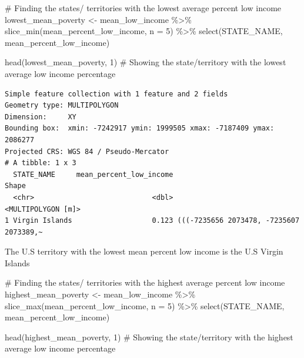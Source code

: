 \documentclass[
  letterpaper,
  DIV=11,
  numbers=noendperiod]{scrartcl}
\newenvironment{Shaded}{\begin{snugshade}}{\end{snugshade}}
\newcommand{\AttributeTok}[1]{\textcolor[rgb]{0.40,0.45,0.13}{#1}}
\newcommand{\CommentTok}[1]{\textcolor[rgb]{0.37,0.37,0.37}{#1}}
\newcommand{\DecValTok}[1]{\textcolor[rgb]{0.68,0.00,0.00}{#1}}
\newcommand{\FunctionTok}[1]{\textcolor[rgb]{0.28,0.35,0.67}{#1}}
\newcommand{\NormalTok}[1]{\textcolor[rgb]{0.00,0.23,0.31}{#1}}
\newcommand{\OtherTok}[1]{\textcolor[rgb]{0.00,0.23,0.31}{#1}}
\newcommand{\SpecialCharTok}[1]{\textcolor[rgb]{0.37,0.37,0.37}{#1}}
\begin{document}
\begin{Shaded}
\begin{Highlighting}[]
\CommentTok{\# Finding the states/ territories with the lowest average percent low income}
\NormalTok{lowest\_mean\_poverty }\OtherTok{\textless{}{-}}\NormalTok{ mean\_low\_income }\SpecialCharTok{\%\textgreater{}\%}
  \FunctionTok{slice\_min}\NormalTok{(mean\_percent\_low\_income, }\AttributeTok{n =} \DecValTok{5}\NormalTok{) }\SpecialCharTok{\%\textgreater{}\%}
  \FunctionTok{select}\NormalTok{(STATE\_NAME, mean\_percent\_low\_income)}

\FunctionTok{head}\NormalTok{(lowest\_mean\_poverty, }\DecValTok{1}\NormalTok{) }\CommentTok{\# Showing the state/territory with the lowest average low income percentage}
\end{Highlighting}
\end{Shaded}

\begin{verbatim}
Simple feature collection with 1 feature and 2 fields
Geometry type: MULTIPOLYGON
Dimension:     XY
Bounding box:  xmin: -7242917 ymin: 1999505 xmax: -7187409 ymax: 2086277
Projected CRS: WGS 84 / Pseudo-Mercator
# A tibble: 1 x 3
  STATE_NAME     mean_percent_low_income                                   Shape
  <chr>                            <dbl>                      <MULTIPOLYGON [m]>
1 Virgin Islands                   0.123 (((-7235656 2073478, -7235607 2073389,~
\end{verbatim}

The U.S territory with the lowest mean percent low income is the U.S
Virgin Islands

\begin{Shaded}
\begin{Highlighting}[]
\CommentTok{\# Finding the states/ territories with the highest average percent low income}
\NormalTok{highest\_mean\_poverty }\OtherTok{\textless{}{-}}\NormalTok{ mean\_low\_income }\SpecialCharTok{\%\textgreater{}\%}
  \FunctionTok{slice\_max}\NormalTok{(mean\_percent\_low\_income, }\AttributeTok{n =} \DecValTok{5}\NormalTok{) }\SpecialCharTok{\%\textgreater{}\%}
  \FunctionTok{select}\NormalTok{(STATE\_NAME, mean\_percent\_low\_income)}

\FunctionTok{head}\NormalTok{(highest\_mean\_poverty, }\DecValTok{1}\NormalTok{) }\CommentTok{\# Showing the state/territory with the highest average low income percentage}
\end{Highlighting}
\end{Shaded}
\end{document}

